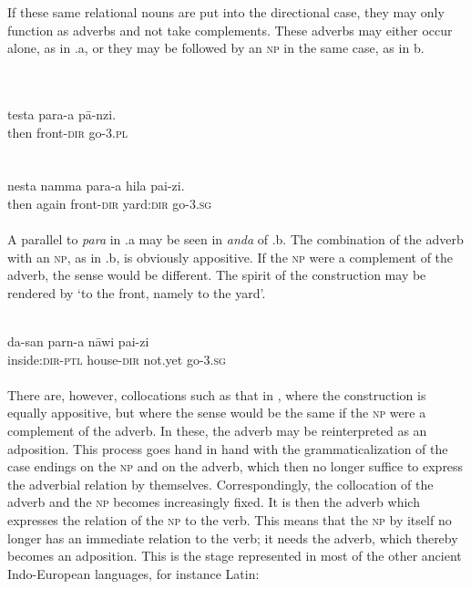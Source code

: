 
\noindent If these same relational nouns are put into the directional case, they may only function as adverbs and not take complements. These adverbs may either occur alone, as in .a, or they may be followed by an \textsc{np} in the same case, as in b.

\ea\label{ex:E69}
\langinfo{\LangHitt}{}{} \\
 \ea {}\\
 \gll  testa  para-a  p\=a-nzi.\\
  then  front-\textsc{dir}  go-3.\textsc{pl}\\
\\
\newpage
\ex {}\\
\gll  nesta  namma  para-a  hila  pai-zi.\\
  then  again front-\textsc{dir}  yard:\textsc{dir}  go-3.\textsc{sg}\\
\\
\z
\z
\noindent  A parallel to \textit{para} in .a may be seen in \textit{anda} of .b. The combination of the adverb with an \textsc{np}, as in .b, is obviously appositive. If the \textsc{np} were a complement of the adverb, the sense would be different. The spirit of the construction may be rendered by ‘to the front, namely to the yard’.

\ea\label{ex:E70} 
\\
 \gll da-san  parn-a  n\=awi  pai-zi\\
 inside:\textsc{dir}-\textsc{ptl}  house-\textsc{dir}  not.yet  go-3.\textsc{sg}\\
\\
\z
\noindent There are, however, collocations such as that in , where the construction is equally appositive, but where the sense would be the same if the \textsc{np} were a complement of the adverb. In these, the adverb may be reinterpreted as an adposition. This process goes hand in hand with the grammaticalization of the case endings on the \textsc{np} and on the adverb, which then no longer suffice to express the adverbial relation by themselves.\label{page100b} Correspondingly, the collocation of the adverb and the \textsc{np} becomes increasingly fixed. It is then the adverb which expresses the relation of the \textsc{np} to the verb. This means that the \textsc{np} by itself no longer has an immediate relation to the verb; it needs the adverb, which thereby becomes an adposition. This is the stage represented in most of the other ancient Indo-European languages, for instance Latin:

